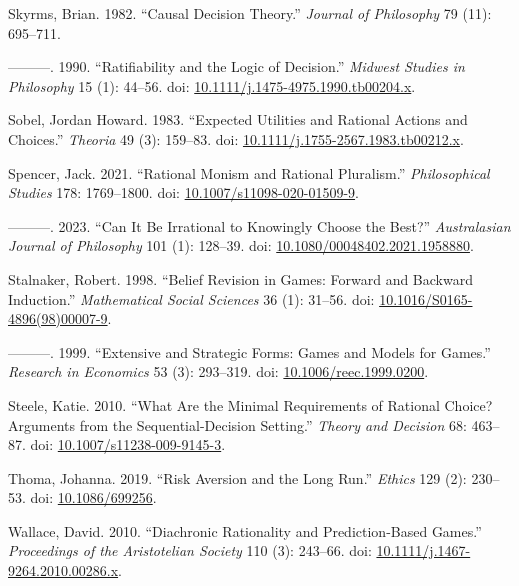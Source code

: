 \documentclass[
  10pt,
  letterpaper,
  DIV=11,
  numbers=noendperiod,
  twoside]{scrartcl}
\newlength{\cslhangindent}
\newenvironment{CSLReferences}[2] %
 {\begin{list}{}{%
  \setlength{\itemindent}{0pt}
  \setlength{\leftmargin}{0pt}
  \setlength{\parsep}{0pt}
  \ifodd #1
   \setlength{\leftmargin}{\cslhangindent}
   \setlength{\itemindent}{-1\cslhangindent}
  \fi
  \setlength{\itemsep}{#2\baselineskip}}}
 {\end{list}}
\begin{document}
\begin{CSLReferences}{1}{0}
Skyrms, Brian. 1982. {``Causal Decision Theory.''} \emph{Journal of
Philosophy} 79 (11): 695--711.

---------. 1990. {``Ratifiability and the Logic of Decision.''}
\emph{Midwest Studies in Philosophy} 15 (1): 44--56. doi:
\href{https://doi.org/10.1111/j.1475-4975.1990.tb00204.x}{10.1111/j.1475-4975.1990.tb00204.x}.

Sobel, Jordan Howard. 1983. {``Expected Utilities and Rational Actions
and Choices.''} \emph{Theoria} 49 (3): 159--83. doi:
\href{https://doi.org/10.1111/j.1755-2567.1983.tb00212.x}{10.1111/j.1755-2567.1983.tb00212.x}.

Spencer, Jack. 2021. {``Rational Monism and Rational Pluralism.''}
\emph{Philosophical Studies} 178: 1769--1800. doi:
\href{https://doi.org/10.1007/s11098-020-01509-9}{10.1007/s11098-020-01509-9}.

---------. 2023. {``Can It Be Irrational to Knowingly Choose the
Best?''} \emph{Australasian Journal of Philosophy} 101 (1): 128--39.
doi:
\href{https://doi.org/10.1080/00048402.2021.1958880}{10.1080/00048402.2021.1958880}.

Stalnaker, Robert. 1998. {``Belief Revision in Games: Forward and
Backward Induction.''} \emph{Mathematical Social Sciences} 36 (1):
31--56. doi:
\href{https://doi.org/10.1016/S0165-4896(98)00007-9}{10.1016/S0165-4896(98)00007-9}.

---------. 1999. {``Extensive and Strategic Forms: Games and Models for
Games.''} \emph{Research in Economics} 53 (3): 293--319. doi:
\href{https://doi.org/10.1006/reec.1999.0200}{10.1006/reec.1999.0200}.

Steele, Katie. 2010. {``What Are the Minimal Requirements of Rational
Choice? Arguments from the Sequential-Decision Setting.''} \emph{Theory
and Decision} 68: 463--87. doi:
\href{https://doi.org/10.1007/s11238-009-9145-3}{10.1007/s11238-009-9145-3}.

Thoma, Johanna. 2019. {``Risk Aversion and the Long Run.''}
\emph{Ethics} 129 (2): 230--53. doi:
\href{https://doi.org/10.1086/699256}{10.1086/699256}.

Wallace, David. 2010. {``Diachronic Rationality and Prediction-Based
Games.''} \emph{Proceedings of the Aristotelian Society} 110 (3):
243--66. doi:
\href{https://doi.org/10.1111/j.1467-9264.2010.00286.x}{10.1111/j.1467-9264.2010.00286.x}.


\end{CSLReferences}
\end{document}
